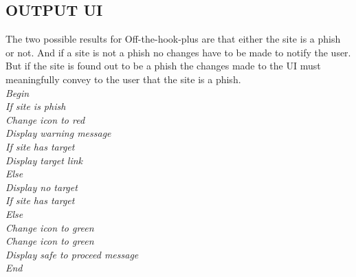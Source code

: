 \subsection{OUTPUT UI}
The two possible results for Off-the-hook-plus are that either the site is a phish or not. And if a site is not a phish no changes have to be made to notify the user. But if the site is found out to be a phish the changes made to the UI must meaningfully convey to the user that the site is a phish.\\
\null\quad\textit{Begin}\\
\null\quad\quad\textit{If site is phish}\\
\null\quad\quad\quad\textit{Change icon to red}\\
\null\quad\quad\quad\textit{Display warning message}\\
\null\quad\quad\quad\textit{If site has target}\\
\null\quad\quad\quad\quad\textit{Display target link}\\
\null\quad\quad\quad\textit{Else}\\
\null\quad\quad\quad\quad\textit{Display no target}\\
\null\quad\quad\quad\textit{If site has target}\\
\null\quad\quad\textit{Else}\\
\null\quad\quad\quad\textit{Change icon to green}\\
\null\quad\quad\quad\textit{Change icon to green}\\
\null\quad\quad\textit{Display safe to proceed message}\\
\null\quad\textit{End}\\
